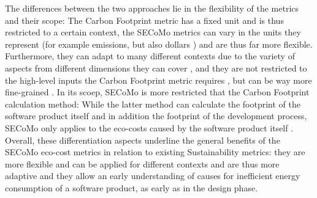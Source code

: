 \documentclass[oribibl]{llncs}
\begin{document}
The differences between the two approaches lie in the flexibility of the metrics and their scope: The Carbon Footprint metric has a fixed unit and is thus restricted to a certain context, the SECoMo metrics can vary in the units they represent (for example  emissions, but also dollars \cite{schulze_cost_2016}) and are thus far more flexible. Furthermore, they can adapt to many different contexts due to the variety of aspects from different dimensions they can cover \cite{schulze_cost_2016}, and they are not restricted to the high-level inputs the Carbon Footprint metric requires \cite{kern_impacts_2015}, but can be way more fine-grained \cite{schulze_cost_2016}. In its scoep, SECoMo is more restricted that the Carbon Footprint calculation method: While the latter method can calculate the footprint of the software product itself and in addition the footprint of the development process\cite{kern_impacts_2015}, SECoMo only applies to the eco-costs caused by the software product itself \cite{schulze_cost_2016}. 
\\ Overall, these differentiation aspects underline the general benefits of the SECoMo eco-cost metrics in relation to existing Sustainability metrics: they are more flexible and can be applied for different contexts and are  thus more adaptive and they allow an early understanding of causes for inefficient energy consumption of a software product, as early as in the design phase. %
\end{document}
